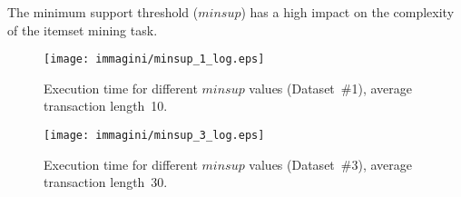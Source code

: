 The minimum support threshold ($minsup$) has a high impact on the complexity of
the itemset mining task. 





\begin{figure}[!t]
\texttt{[image: immagini/minsup\_1\_log.eps]}
\caption{Execution time for different $minsup$ values
(Dataset~\#1), average transaction length~10.}
\label{minsup_1}
\end{figure}




\begin{figure}[!t]
\texttt{[image: immagini/minsup\_3\_log.eps]}
\caption{Execution time for different $minsup$ values
(Dataset~\#3), average transaction length~30.}
\label{minsup_3}
\end{figure}



